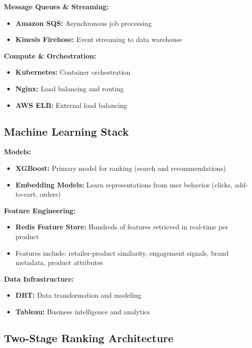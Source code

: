 \documentclass[11pt,letterpaper]{article}
\begin{document}
\textbf{Message Queues \& Streaming:}
\begin{itemize}
    \item \textbf{Amazon SQS:} Asynchronous job processing
    \item \textbf{Kinesis Firehose:} Event streaming to data warehouse
\end{itemize}

\textbf{Compute \& Orchestration:}
\begin{itemize}
    \item \textbf{Kubernetes:} Container orchestration
    \item \textbf{Nginx:} Load balancing and routing
    \item \textbf{AWS ELB:} External load balancing
\end{itemize}

\subsection{Machine Learning Stack}

\textbf{Models:}
\begin{itemize}
    \item \textbf{XGBoost:} Primary model for ranking (search and recommendations)
    \item \textbf{Embedding Models:} Learn representations from user behavior (clicks, add-to-cart, orders)
\end{itemize}

\textbf{Feature Engineering:}
\begin{itemize}
    \item \textbf{Redis Feature Store:} Hundreds of features retrieved in real-time per product
    \item Features include: retailer-product similarity, engagement signals, brand metadata, product attributes
\end{itemize}

\textbf{Data Infrastructure:}
\begin{itemize}
    \item \textbf{DBT:} Data transformation and modeling
    \item \textbf{Tableau:} Business intelligence and analytics
\end{itemize}

\subsection{Two-Stage Ranking Architecture}
\end{document}
